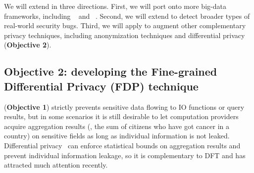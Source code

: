 



 We will extend \kakute in 
three directions. First, we will port \kakute onto more big-data frameworks, 
including \pig~\cite{pig:vldb08} and \hadoop~\cite{hadoop}. Second, we will 
extend \kakute to detect broader types of real-world security bugs. Third, we 
will apply \kakute to augment other complementary privacy techniques, including 
anonymization techniques and differential privacy (\textbf{Objective 2}). 

\vspace{-.15in}\subsection{Objective 2: developing the Fine-grained 
Differential Privacy (FDP) technique}\label{sec:obj2}\vspace{-.075in}



\kakute (\textbf{Objective 1}) strictly prevents
sensitive data flowing to IO functions or query results, but in some scenarios 
it is still desirable to let computation providers acquire aggregation 
results (\eg, the sum of citizens who have got cancer in a country) 
on sensitive fields as long as individual information is not leaked. 
Differential privacy~\cite{Dwork2006Differential, 
Dwork2011a} can enforce statistical bounds on 
aggregation results and prevent individual information leakage, so it is 
complementary to DFT and has attracted much attention recently.


